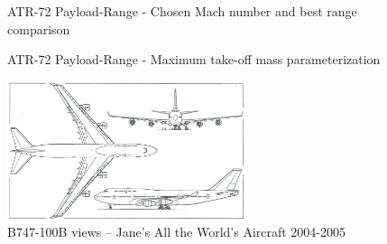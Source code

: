 \documentclass[a4paper,12pt,oneside]{book}
\begin{document}
\begin{figure}[!h]
\centering

\caption{ATR-72 Payload-Range - Chosen Mach number and best range comparison}
\end{figure}

\begin{figure}[!h]
\centering

\caption{ATR-72 Payload-Range - Maximum take-off mass parameterization}
\end{figure}

\begin{figure}[!ht]
\centering
\includegraphics[keepaspectratio, width=0.62\textwidth]{B747-100B}
\caption{B747-100B views – Jane's All the World's Aircraft 2004-2005}
\label{fig:Figure7}
\end{figure}
\end{document}
